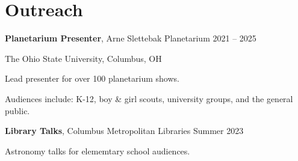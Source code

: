 \section*{Outreach}

{\bf Planetarium Presenter}, Arne Slettebak Planetarium 
\hfill 2021 -- 2025

The Ohio State University, Columbus, OH

Lead presenter for over 100 planetarium shows.

Audiences include: K-12, boy \& girl scouts, university groups, and the general public.

\vspace{12pt}
\noindent
{\bf Library Talks}, Columbus Metropolitan Libraries
\hfill Summer 2023

Astronomy talks for elememtary school audiences.